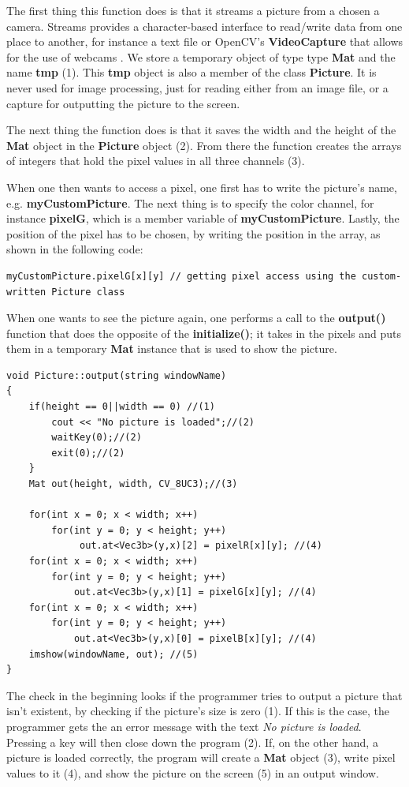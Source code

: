 The first thing this function does is that it streams a picture from a chosen a camera. Streams provides a character-based interface to read/write data from one place to another, for instance a text file or OpenCV's \textbf{VideoCapture} that allows for the use of webcams \citep{stream}. We store a temporary object of type type \textbf{Mat} and the name \textbf{tmp} (1). This \textbf{tmp} object is also a member of the class \textbf{Picture}. It is never used for image processing, just for reading either from an image file, or a capture for outputting the picture to the screen.

The next thing the function does is that it saves the width and the height of the \textbf{Mat} object in the \textbf{Picture} object (2). From there the function creates the arrays of integers that hold the pixel values in all three channels (3). 

When one then wants to access a pixel, one first has to write the picture's name, e.g. \textbf{myCustomPicture}. The next thing is to specify the color channel, for instance \textbf{pixelG}, which is a member variable of \textbf{myCustomPicture}. Lastly, the position of the pixel has to be chosen, by writing the position in the array, as shown in the following code:

\begin{lstlisting}
myCustomPicture.pixelG[x][y] // getting pixel access using the custom-written Picture class
\end{lstlisting}

When one wants to see the picture again, one performs a call to the \textbf{output()} function that does the opposite of the \textbf{initialize()}; it takes in the pixels and puts them in a temporary \textbf{Mat} instance that is used to show the picture.

\begin{lstlisting}
void Picture::output(string windowName)
{
	if(height == 0||width == 0) //(1)
		cout << "No picture is loaded";//(2)
		waitKey(0);//(2)
		exit(0);//(2)
	}
	Mat out(height, width, CV_8UC3);//(3)

	for(int x = 0; x < width; x++)
		for(int y = 0; y < height; y++)
			 out.at<Vec3b>(y,x)[2] = pixelR[x][y]; //(4)
	for(int x = 0; x < width; x++)
		for(int y = 0; y < height; y++)
			out.at<Vec3b>(y,x)[1] = pixelG[x][y]; //(4)
	for(int x = 0; x < width; x++)
		for(int y = 0; y < height; y++)
			out.at<Vec3b>(y,x)[0] = pixelB[x][y]; //(4)		
	imshow(windowName, out); //(5)
}
\end{lstlisting}
The check in the beginning looks if the programmer tries to output a picture that isn't existent, by checking if the picture's size is zero (1). If this is the case, the programmer gets the an error message with the text \textit{No picture is loaded}. Pressing a key will then close down the program (2). If, on the other hand, a picture is loaded correctly, the program will create a \textbf{Mat} object (3), write pixel values to it (4), and show the picture on the screen (5) in an output window.

